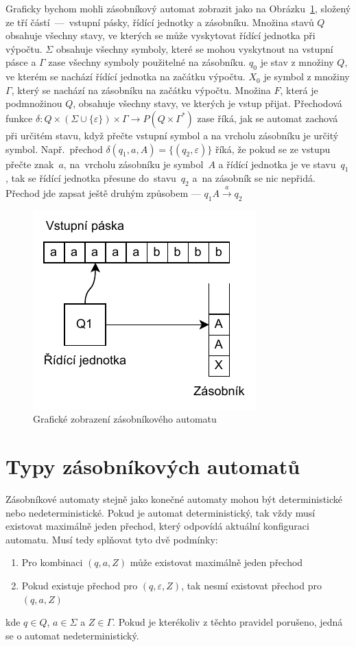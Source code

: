 Graficky bychom mohli zásobníkový automat zobrazit jako na Obrázku~\ref{fig:PDAComponents}, složený ze tří částí~---~vstupní pásky, řídící jednotky a zásobníku. Množina stavů $Q$ obsahuje všechny stavy, ve kterých se může vyskytovat řídící jednotka při výpočtu. $\Sigma$ obsahuje všechny symboly, které se mohou vyskytnout na vstupní pásce a $\Gamma$ zase všechny symboly použitelné na zásobníku. $q_0$ je stav z množiny $Q$, ve kterém se nachází řídící jednotka na začátku výpočtu. $X_0$ je symbol z množiny $\Gamma$, který se nachází na zásobníku na začátku výpočtu. Množina $F$, která je podmnožinou $Q$, obsahuje všechny stavy, ve kterých je vstup přijat. Přechodová funkce $\delta : Q \times (\Sigma \cup \{\varepsilon\}) \times \Gamma \rightarrow P(Q \times \Gamma^*)$ zase říká, jak se automat zachová při určitém stavu, když přečte vstupní symbol a na vrcholu zásobníku je určitý symbol. Např.\ přechod $\delta(q_1,a,A) = \{(q_2,\varepsilon)\}$ říká, že pokud se ze vstupu přečte znak~$a$, na~vrcholu zásobníku je symbol~$A$ a řídící jednotka je ve stavu~$q_1$, tak se řídící jednotka přesune do~stavu~$q_2$ a~na zásobník se nic nepřidá. Přechod jde zapsat ještě druhým způsobem --- $q_1A \xrightarrow{a} q_2$

\begin{figure}[h]
    \centering
    \includegraphics{Figures/PDAComponents.drawio.pdf}
    \caption{Grafické zobrazení zásobníkového automatu}\label{fig:PDAComponents}
\end{figure}

\section{Typy zásobníkových automatů}\label{sec:TypesOfPDA}


Zásobníkové automaty stejně jako konečné automaty mohou být deterministické nebo nedeterministické. Pokud je automat deterministický, tak vždy musí existovat maximálně jeden přechod, který odpovídá aktuální konfiguraci automatu. Musí tedy splňovat tyto dvě podmínky:
\begin{enumerate}
    \item Pro kombinaci $(q,a,Z)$ může existovat maximálně jeden přechod
    \item Pokud existuje přechod pro $(q,\varepsilon,Z)$, tak nesmí existovat přechod pro $(q,a,Z)$
\end{enumerate}
kde $q \in Q$, $a \in \Sigma$ a $Z \in \Gamma$. Pokud je kterékoliv z těchto pravidel porušeno, jedná se o automat nedeterministický.~\cite{Dale2024}

